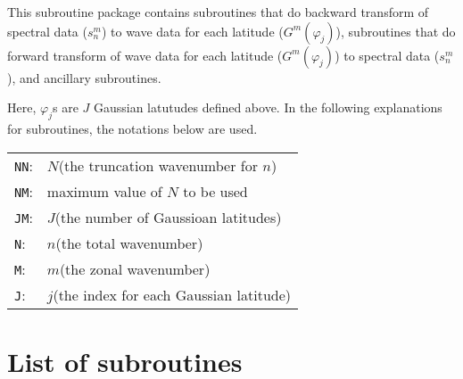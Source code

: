 \documentclass[a4paper]{scrartcl}
\begin{document}
This subroutine package contains
subroutines that do backward transform of spectral data ($s^m_n$) 
to wave data for each latitude ($G^m(\varphi_j)$),
subroutines that do forward transform of
wave data for each latitude ($G^m(\varphi_j)$)
to spectral data ($s^m_n$), and ancillary subroutines.

Here, $\varphi_j$s are $J$ Gaussian latutudes defined above.
In the following explanations for subroutines, the notations below
are used.
\begin{center}
\begin{tabular}{ll}
\texttt{NN}:& $N$(the truncation wavenumber for $n$)\\
\texttt{NM}:& maximum value of $N$ to be used\\
\texttt{JM}:& $J$(the number of Gaussioan latitudes)\\
\texttt{N}:& $n$(the total wavenumber)\\
\texttt{M}:& $m$(the zonal wavenumber)\\
\texttt{J}:& $j$(the index for each Gaussian latitude)
\end{tabular}
\end{center}



\section{List of subroutines}
\end{document}
